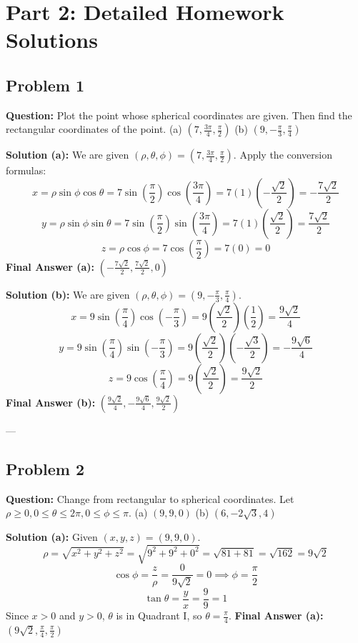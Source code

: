 \documentclass[12pt]{article}
\begin{document}
\newpage
\section{Part 2: Detailed Homework Solutions}

\subsection*{Problem 1}
\textbf{Question:} Plot the point whose spherical coordinates are given. Then find the rectangular coordinates of the point.
(a) $(7, \frac{3\pi}{4}, \frac{\pi}{2})$
(b) $(9, -\frac{\pi}{3}, \frac{\pi}{4})$

\textbf{Solution (a):}
We are given $(\rho, \theta, \phi) = (7, \frac{3\pi}{4}, \frac{\pi}{2})$.
Apply the conversion formulas:
\[ x = \rho \sin\phi \cos\theta = 7 \sin\left(\frac{\pi}{2}\right) \cos\left(\frac{3\pi}{4}\right) = 7(1)\left(-\frac{\sqrt{2}}{2}\right) = -\frac{7\sqrt{2}}{2} \]
\[ y = \rho \sin\phi \sin\theta = 7 \sin\left(\frac{\pi}{2}\right) \sin\left(\frac{3\pi}{4}\right) = 7(1)\left(\frac{\sqrt{2}}{2}\right) = \frac{7\sqrt{2}}{2} \]
\[ z = \rho \cos\phi = 7 \cos\left(\frac{\pi}{2}\right) = 7(0) = 0 \]
\textbf{Final Answer (a):} $\left( -\frac{7\sqrt{2}}{2}, \frac{7\sqrt{2}}{2}, 0 \right)$

\textbf{Solution (b):}
We are given $(\rho, \theta, \phi) = (9, -\frac{\pi}{3}, \frac{\pi}{4})$.
\[ x = 9 \sin\left(\frac{\pi}{4}\right) \cos\left(-\frac{\pi}{3}\right) = 9 \left(\frac{\sqrt{2}}{2}\right) \left(\frac{1}{2}\right) = \frac{9\sqrt{2}}{4} \]
\[ y = 9 \sin\left(\frac{\pi}{4}\right) \sin\left(-\frac{\pi}{3}\right) = 9 \left(\frac{\sqrt{2}}{2}\right) \left(-\frac{\sqrt{3}}{2}\right) = -\frac{9\sqrt{6}}{4} \]
\[ z = 9 \cos\left(\frac{\pi}{4}\right) = 9 \left(\frac{\sqrt{2}}{2}\right) = \frac{9\sqrt{2}}{2} \]
\textbf{Final Answer (b):} $\left( \frac{9\sqrt{2}}{4}, -\frac{9\sqrt{6}}{4}, \frac{9\sqrt{2}}{2} \right)$

---

\subsection*{Problem 2}
\textbf{Question:} Change from rectangular to spherical coordinates. Let $\rho \ge 0, 0 \le \theta \le 2\pi, 0 \le \phi \le \pi$.
(a) $(9, 9, 0)$
(b) $(6, -2\sqrt{3}, 4)$

\textbf{Solution (a):}
Given $(x, y, z) = (9, 9, 0)$.
\[ \rho = \sqrt{x^2 + y^2 + z^2} = \sqrt{9^2 + 9^2 + 0^2} = \sqrt{81 + 81} = \sqrt{162} = 9\sqrt{2} \]
\[ \cos\phi = \frac{z}{\rho} = \frac{0}{9\sqrt{2}} = 0 \implies \phi = \frac{\pi}{2} \]
\[ \tan\theta = \frac{y}{x} = \frac{9}{9} = 1 \]
Since $x>0$ and $y>0$, $\theta$ is in Quadrant I, so $\theta = \frac{\pi}{4}$.
\textbf{Final Answer (a):} $\left( 9\sqrt{2}, \frac{\pi}{4}, \frac{\pi}{2} \right)$
\end{document}

